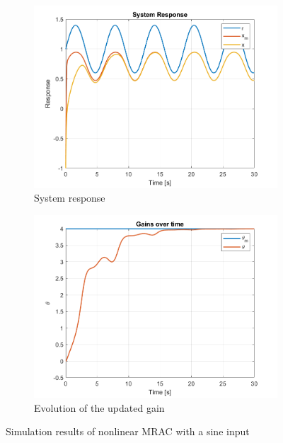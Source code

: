 \begin{figure}[!t]
 \centering
 \begin{subfigure}[b]{0.49\linewidth}
  \centering
  \includegraphics[width=\linewidth]{images/NL-MRAC-SIM/Sine/v2/NMRAC_First-Order_Response.png}
  \caption{System response}
  \label{fig:sine}
 \end{subfigure}
 \hfill
 \begin{subfigure}[b]{0.49\linewidth}
  \centering
  \includegraphics[width=\linewidth]{images/NL-MRAC-SIM/Sine/v2/NMRAC_First-Order_Parameters.png}
  \caption{Evolution of the updated gain}
  \label{fig:sine-weights}
 \end{subfigure}
 \caption{Simulation results of nonlinear MRAC with a sine input}
 \label{fig:nl-sine}
\end{figure}


